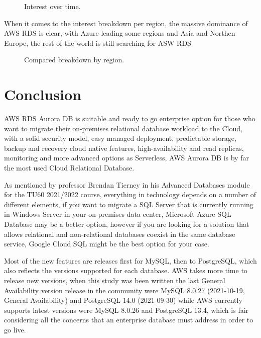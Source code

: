 \documentclass{article}
\begin{document}
\begin{figure}[hbt!]
\centering
\caption{\label{fig:Interest} Interest over time.}
\end{figure}

When it comes to the interest breakdown per region, the massive dominance of AWS RDS is clear, with Azure leading some regions and Asia and Northen Europe, the rest of the world is still searching for ASW RDS 
\begin{figure}[hbt!]
\centering
\caption{\label{fig:Compared} Compared breakdown by region.}
\end{figure}

\clearpage
\section{Conclusion}

AWS RDS Aurora DB is suitable and ready to go enterprise option for those who want to migrate their on-premises relational database workload to the Cloud, with a solid security model, easy managed deployment, predictable storage, backup and recovery cloud native features, high-availability and read replicas, monitoring and more advanced options as Serverless, AWS Aurora DB is by far the most used Cloud Relational Database. 

As mentioned by professor Brendan Tierney in his Advanced Databases module for the TU60 2021/2022 course, everything in technology depends on a number of different elements, if you want to migrate a SQL Server that is currently running in Windows Server in your on-premises data center, Microsoft Azure SQL Database may be a better option, however if you are looking for a solution that allows relational and non-relational databases coexist in the same database service, Google Cloud SQL might be the best option for your case.

Most of the new features are releases first for MySQL, then to PostgreSQL, which also reflects the versions supported for each database. AWS takes more time to release new versions, when this study was been written the last General Availability version release in the community were MySQL 8.0.27 (2021-10-19, General Availability) and PostgreSQL 14.0 (2021-09-30) while AWS currently supports latest versions were MySQL 8.0.26 and PostgreSQL 13.4, which is fair considering all the concerns that an enterprise database must address in order to go live. 


\clearpage


\end{document}
